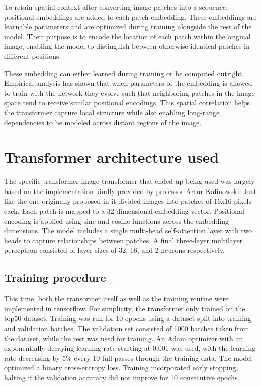 \documentclass{pracalicmgr}
\begin{document}
To retain spatial context after converting image patches into a sequence, positional embeddings are added to each patch embedding. These embeddings are learnable parameters and are optimized during training alongside the rest of the model. Their purpose is to encode the location of each patch within the original image, enabling the model to distinguish between otherwise identical patches in different positions.

These embedding can either learned during training or be computed outright. Empirical analysis has shown that when parameters of the embedding is allowed to train with the network they evolve such that neighboring patches in the image space tend to receive similar positional encodings. This spatial correlation helps the transformer capture local structure while also enabling long-range dependencies to be modeled across distant regions of the image.


\section{Transformer architecture used}

The specific transformer image transformer that ended up being used was largely based on the implementation kindly provided by professor Artur Kalinowski. Just like the one originally proposed in \cite{ViT} it divided images into patches of 16x16 pixels each. Each patch is mapped to a 32-dimensional embedding vector. Positional encoding is applied using sine and cosine functions across the embedding dimensions. The model includes a single multi-head self-attention layer with two heads to capture relationships between patches. A final three-layer multilayer perceptron consisted of layer sizes of 32, 16, and 2 neurons respectively.

\subsection{Training procedure}

This time, both the transormer itself as well as the training routine were implemented in tensorflow. For simplicity, the transformer only trained on the top50 dataset. Training was run for 10 epochs using a dataset split into training and validation batches. The validation set consisted of 1000 batches taken from the dataset, while the rest was used for training. An Adam optimizer with an exponentially decaying learning rate starting at 0.001 was used, with the learning rate decreasing by 5\% every 10 full passes through the training data. The model optimized a binary cross-entropy loss. Training incorporated early stopping, halting if the validation accuracy did not improve for 10 consecutive epochs.
\end{document}
